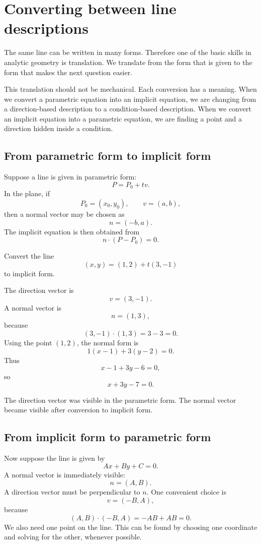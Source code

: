 \section{Converting between line descriptions}

The same line can be written in many forms. Therefore one of the basic skills in analytic geometry is translation. We translate from the form that is given to the form that makes the next question easier.

This translation should not be mechanical. Each conversion has a meaning. When we convert a parametric equation into an implicit equation, we are changing from a direction-based description to a condition-based description. When we convert an implicit equation into a parametric equation, we are finding a point and a direction hidden inside a condition.

\subsection*{From parametric form to implicit form}

Suppose a line is given in parametric form:
\[
P=P_0+t v.
\]
In the plane, if
\[
P_0=(x_0,y_0),
\qquad
v=(a,b),
\]
then a normal vector may be chosen as
\[
n=(-b,a).
\]
The implicit equation is then obtained from
\[
n\cdot(P-P_0)=0.
\]

\begin{examplebox}
Convert the line
\[
(x,y)=(1,2)+t(3,-1)
\]
to implicit form.

The direction vector is
\[
v=(3,-1).
\]
A normal vector is
\[
n=(1,3),
\]
because
\[
(3,-1)\cdot(1,3)=3-3=0.
\]
Using the point \((1,2)\), the normal form is
\[
1(x-1)+3(y-2)=0.
\]
Thus
\[
x-1+3y-6=0,
\]
so
\[
x+3y-7=0.
\]
\end{examplebox}

The direction vector was visible in the parametric form. The normal vector became visible after conversion to implicit form.

\subsection*{From implicit form to parametric form}

Now suppose the line is given by
\[
Ax+By+C=0.
\]
A normal vector is immediately visible:
\[
n=(A,B).
\]
A direction vector must be perpendicular to \(n\). One convenient choice is
\[
v=(-B,A),
\]
because
\[
(A,B)\cdot(-B,A)=-AB+AB=0.
\]
We also need one point on the line. This can be found by choosing one coordinate and solving for the other, whenever possible.

